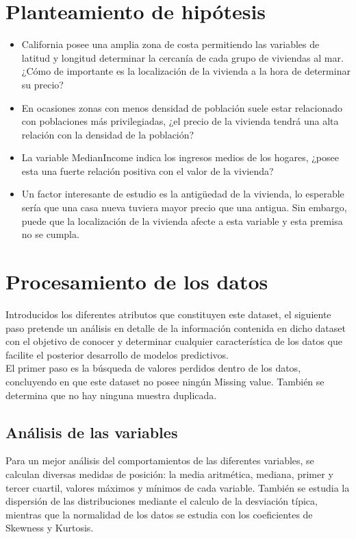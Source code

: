 \section{Planteamiento de hipótesis}
\begin{itemize}
	\item California posee una amplia zona de costa permitiendo las variables de latitud y longitud determinar la cercanía de cada grupo de viviendas al mar. ¿Cómo de importante es la localización de la vivienda a la hora de determinar su precio?
	
	\item En ocasiones zonas con menos densidad de población suele estar relacionado con poblaciones más privilegiadas, ¿el precio de la vivienda tendrá una alta relación con la densidad de la población?
	
	\item La variable MedianIncome indica los ingresos medios de los hogares, ¿posee esta una fuerte relación positiva con el valor de la vivienda?
	
	\item Un factor interesante de estudio es la antigüedad de la vivienda, lo esperable sería que una casa nueva tuviera mayor precio que una antigua. Sin embargo, puede que la localización de la vivienda afecte a esta variable y esta premisa no se cumpla.
\end{itemize}








\section{Procesamiento de los datos}
Introducidos los diferentes atributos que constituyen este dataset, el siguiente paso pretende un análisis en detalle de la información contenida en dicho dataset con el objetivo de conocer y determinar cualquier característica de los datos que facilite el posterior desarrollo de modelos predictivos. \\

El primer paso es la búsqueda de valores perdidos dentro de los datos, concluyendo en que este dataset no posee ningún Missing value.
También se determina que no hay ninguna muestra duplicada.


\subsection{Análisis de las variables}
Para un mejor análisis del comportamientos de las diferentes variables, se calculan diversas medidas de posición: la media aritmética, mediana, primer y tercer cuartil, valores máximos y mínimos de cada variable. También se estudia la dispersión de las distribuciones mediante el calculo  de la desviación típica, mientras que la normalidad de los datos se estudia con los coeficientes de Skewness y Kurtosis.\\



